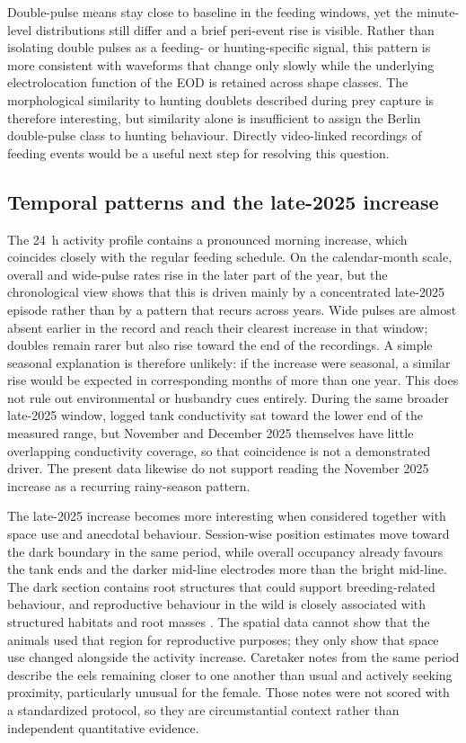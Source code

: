 Double-pulse means stay close to baseline in the feeding windows, yet the minute-level distributions still differ and a brief peri-event rise is visible.
Rather than isolating double pulses as a feeding- or hunting-specific signal, this pattern is more consistent with waveforms that change only slowly while the underlying electrolocation function of the EOD is retained across shape classes. 
The morphological similarity to hunting doublets described during prey capture \parencite{catania2014shocking} is therefore interesting, but similarity alone is insufficient to assign the Berlin double-pulse class to hunting behaviour. 
Directly video-linked recordings of feeding events would be a useful next step for resolving this question.

\subsection{Temporal patterns and the late-2025 increase}

The 24~h activity profile contains a pronounced morning increase, which coincides closely with the regular feeding schedule. 
On the calendar-month scale, overall and wide-pulse rates rise in the later part of the year, but the chronological view shows that this is driven mainly by a concentrated late-2025 episode rather than by a pattern that recurs across years.
Wide pulses are almost absent earlier in the record and reach their clearest increase in that window; doubles remain rarer but also rise toward the end of the recordings.
A simple seasonal explanation is therefore unlikely: if the increase were seasonal, a similar rise would be expected in corresponding months of more than one year.
This does not rule out environmental or husbandry cues entirely.
During the same broader late-2025 window, logged tank conductivity sat toward the lower end of the measured range, but November and December 2025 themselves have little overlapping conductivity coverage, so that coincidence is not a demonstrated driver.
The present data likewise do not support reading the November 2025 increase as a recurring rainy-season pattern.

The late-2025 increase becomes more interesting when considered together with space use and anecdotal behaviour.
Session-wise position estimates move toward the dark boundary in the same period, while overall occupancy already favours the tank ends and the darker mid-line electrodes more than the bright mid-line.
The dark section contains root structures that could support breeding-related behaviour, and reproductive behaviour in the wild is closely associated with structured habitats and root masses \parencite{assunccao1995reproduction, bastos2020historia}.
The spatial data cannot show that the animals used that region for reproductive purposes; they only show that space use changed alongside the activity increase.
Caretaker notes from the same period describe the eels remaining closer to one another than usual and actively seeking proximity, particularly unusual for the female.
Those notes were not scored with a standardized protocol, so they are circumstantial context rather than independent quantitative evidence.

